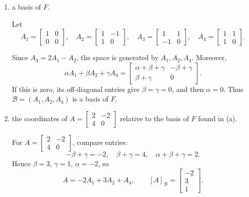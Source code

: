 \begin{enumerate}[label=\alph*)]

\item a basis of $F$.

\begin{answer}
Let
\[
 A_1=\begin{bmatrix}1&0\\0&0\end{bmatrix},\quad
 A_2=\begin{bmatrix}1&-1\\1&0\end{bmatrix},\quad
 A_3=\begin{bmatrix}1&1\\-1&0\end{bmatrix},\quad
 A_4=\begin{bmatrix}1&1\\1&0\end{bmatrix}.
\]

Since $A_3=2A_1-A_2$, the space is generated by $A_1,A_2,A_4$.
Moreover,
\[
 \alpha A_1+\beta A_2+\gamma A_4
 =\begin{bmatrix}\alpha+\beta+\gamma&-\beta+\gamma\\\beta+\gamma&0\end{bmatrix}.
\]
If this is zero, its off-diagonal entries give $\beta=\gamma=0$, and then
$\alpha=0$. Thus $\mathcal B=(A_1,A_2,A_4)$ is a basis of $F$.
\end{answer}

\item the coordinates of $A=\begin{bmatrix}2&-2\\4&0\end{bmatrix}$ relative to the basis of $F$ found in (a).

\begin{answer}
For $A=\begin{bmatrix}2&-2\\4&0\end{bmatrix}$, compare entries:
\[
 -\beta+\gamma=-2,\quad\beta+\gamma=4,\quad\alpha+\beta+\gamma=2.
\]
Hence $\beta=3$, $\gamma=1$, $\alpha=-2$, so
\[
 A=-2A_1+3A_2+A_4,\qquad [A]_{\mathcal B}=\begin{bmatrix}-2\\3\\1\end{bmatrix}.
\]
\end{answer}
\end{enumerate}
